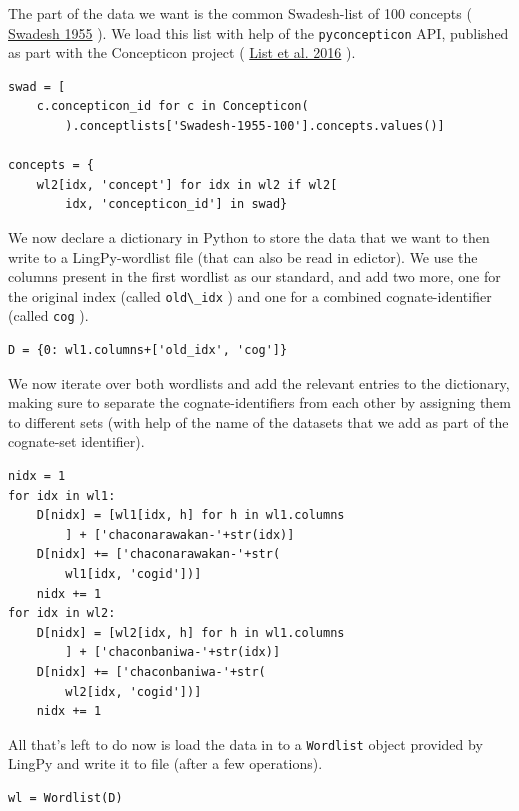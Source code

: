 \documentclass[
  english,
  a4paper,
  oneside,tablecaptionabove
]{scrbook}
\newcommand{\passthrough}[1]{#1}
\begin{document}
\leavevmode\hypertarget{markdown}{}%
The part of the data we want is the common Swadesh-list of 100 concepts
( \href{http://bibliography.lingpy.org?key=Swadesh1955}{Swadesh 1955} ).
We load this list with help of the
\passthrough{\lstinline!pyconcepticon!} API, published as part with the
Concepticon project (
\href{http://bibliography.lingpy.org?key=List2016a}{List et al. 2016} ).

\begin{lstlisting}
swad = [
    c.concepticon_id for c in Concepticon(
        ).conceptlists['Swadesh-1955-100'].concepts.values()]

concepts = {
    wl2[idx, 'concept'] for idx in wl2 if wl2[
        idx, 'concepticon_id'] in swad}
\end{lstlisting}

\leavevmode\hypertarget{markdown}{}%
We now declare a dictionary in Python to store the data that we want to
then write to a LingPy-wordlist file (that can also be read in edictor).
We use the columns present in the first wordlist as our standard, and
add two more, one for the original index (called
\passthrough{\lstinline!old\_idx!} ) and one for a combined
cognate-identifier (called \passthrough{\lstinline!cog!} ).

\begin{lstlisting}
D = {0: wl1.columns+['old_idx', 'cog']}
\end{lstlisting}

We now iterate over both wordlists and add the relevant entries to the
dictionary, making sure to separate the cognate-identifiers from each
other by assigning them to different sets (with help of the name of the
datasets that we add as part of the cognate-set identifier).

\begin{lstlisting}
nidx = 1
for idx in wl1:
    D[nidx] = [wl1[idx, h] for h in wl1.columns
        ] + ['chaconarawakan-'+str(idx)]
    D[nidx] += ['chaconarawakan-'+str(
        wl1[idx, 'cogid'])]
    nidx += 1
for idx in wl2:
    D[nidx] = [wl2[idx, h] for h in wl1.columns
        ] + ['chaconbaniwa-'+str(idx)]
    D[nidx] += ['chaconbaniwa-'+str(
        wl2[idx, 'cogid'])]
    nidx += 1
\end{lstlisting}

All that's left to do now is load the data in to a
\passthrough{\lstinline!Wordlist!} object provided by LingPy and write
it to file (after a few operations).

\begin{lstlisting}
wl = Wordlist(D)
\end{lstlisting}
\end{document}
